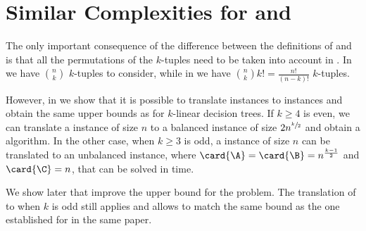 \section{Similar Complexities for \kSUM and \kLDT}

The only important consequence of the difference between the definitions of
\kSUM and \kLDT is that all the permutations of the $k$-tuples need to be taken
into account in \kLDT. In \kSUM we have $\binom{n}{k}$ $k$-tuples to consider,
while in \kLDT we have $\binom{n}{k} k! = \frac{n!}{(n-k)!}$ $k$-tuples.

However, in  we show that it is possible to translate
\kLDT instances to
\kSUM instances and obtain the same upper bounds as \kSUM for $k$-linear
decision trees. If $k \ge 4$ is even, we can translate a \kLDT instance of
size \(n\) to a balanced \twoSUM instance of size \(2n^{\sfrac{k}{2}}\)
and obtain a  algorithm. In the other case, when
$k \ge 3$ is odd, a \kLDT instance of size \(n\) can be translated to an unbalanced \threeSUM instance, where
\(\card{\A} = \card{\B} = n^{\frac{k-1}{2}}\) and \(\card{\C} = n\), that can be solved in
 time.

We show later that \citet*{gronlund:2014} improve the upper bound for the
\threeSUM problem. The translation of \kLDT to \threeSUM when $k$ is
odd still applies
and allows to match the same 
bound as the one established for \threeSUM in the same paper.

